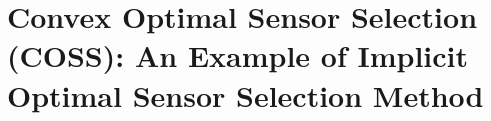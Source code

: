 
%
%
%
%

\chapter{Convex Optimal Sensor Selection (COSS): An Example of Implicit Optimal Sensor Selection Method}\label{s:COSS}


